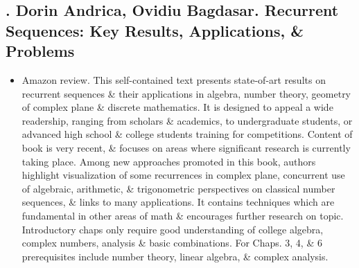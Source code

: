 \documentclass{article}
\begin{document}

\subsection{\cite{Andrica_Bagdasar2020}. {\sc Dorin Andrica, Ovidiu Bagdasar}. Recurrent Sequences: Key Results, Applications, \& Problems}
{}
\begin{itemize}
	\item {\sf Amazon review.} This self-contained text presents state-of-art results on recurrent sequences \& their applications in algebra, number theory, geometry of complex plane \& discrete mathematics. It is designed to appeal a wide readership, ranging from scholars \& academics, to undergraduate students, or advanced high school \& college students training for competitions. Content of book is very recent, \& focuses on areas where significant research is currently taking place. Among new approaches promoted in this book, authors highlight visualization of some recurrences in complex plane, concurrent use of algebraic, arithmetic, \& trigonometric perspectives on classical number sequences, \& links to many applications. It contains techniques which are fundamental in other areas of math \& encourages further research on topic. Introductory chaps only require good understanding of college algebra, complex numbers, analysis \& basic combinations. For Chaps. 3, 4, \& 6 prerequisites include number theory, linear algebra, \& complex analysis.
	

\end{itemize}
\end{document}
